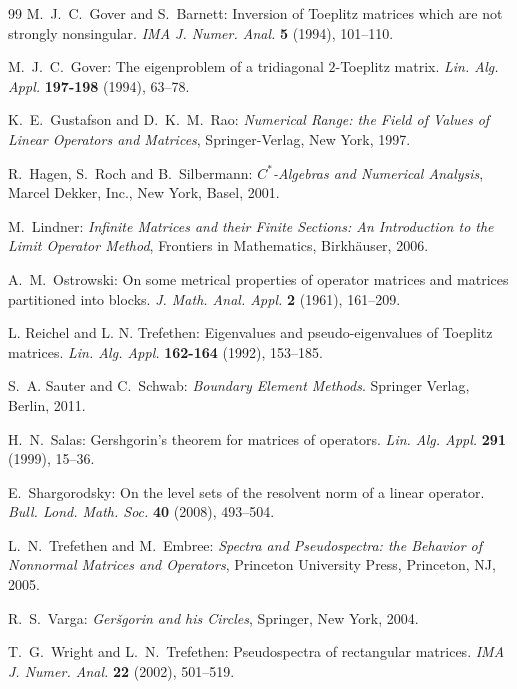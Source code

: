 \documentclass[preprint,1p,11pt]{elsarticle}
\newcommand\eps{{\varepsilon}}
\numberwithin{equation}{section}   %
\numberwithin{figure}{section}  %
\begin{document}
\begin{thebibliography}{99}
{\sc M.~J.~C.~Gover} and {\sc S.~Barnett}:
Inversion of Toeplitz matrices which are not strongly nonsingular.
{\it IMA J. Numer. Anal.} {\bf 5} (1994), 101--110.
 
{\sc M.~J.~C.~Gover}:
The eigenproblem of a tridiagonal $2$-Toeplitz matrix.
{\it Lin. Alg. Appl.} {\bf 197-198} (1994), 63--78.

{\sc K.~E.~Gustafson} and {\sc D.~K.~M.~Rao}:
{\it Numerical Range: the Field of Values of Linear Operators and Matrices},
Springer-Verlag, New York, 1997.


{\sc R.~Hagen, S.~Roch} and {\sc B.~Silbermann:}
{\it $C^*$-Algebras and Numerical Analysis},
Marcel Dekker, Inc., New York, Basel, 2001.

{\sc M.~Lindner}:
{\it Infinite Matrices and their Finite Sections: An Introduction to the Limit Operator Method},
Frontiers in Mathematics, Birkh\"auser, 2006.

{\sc A.~M.~Ostrowski:} On some metrical properties of operator matrices and matrices partitioned into blocks.
{\em J. Math. Anal. Appl.} {\bf 2} (1961), 161--209.

 {\sc L. Reichel} and {\sc L. N. Trefethen}:
Eigenvalues and pseudo-eigenvalues of Toeplitz matrices.
{\it Lin. Alg. Appl.} {\bf 162-164} (1992), 153--185.

{\sc S.~A. Sauter} and {\sc C.~Schwab:} {\em Boundary Element Methods}.
Springer Verlag, Berlin, 2011.

{\sc H.~N.~Salas:}
Gershgorin's theorem for matrices of
operators.
{\it Lin. Alg. Appl.} {\bf 291} (1999), 15--36.


{\sc E.~Shargorodsky}:
On the level sets of the resolvent norm of a linear operator.
{\it Bull. Lond. Math. Soc.} {\bf 40} (2008), 493--504.


{\sc L.~N.~Trefethen} and {\sc M.~Embree}:
{\it Spectra and Pseudospectra: the Behavior of Nonnormal Matrices and Operators},
Princeton University Press, Princeton, NJ, 2005.

{\sc R.~S.~Varga}:
{\em Ger\v{s}gorin and his Circles},
Springer, New York, 2004.

{\sc T.~G.~Wright} and {\sc L.~N.~Trefethen}:
Pseudospectra of rectangular matrices.
{\it IMA J. Numer. Anal.} {\bf 22} (2002), 501--519.
\end{thebibliography}
\end{document}

